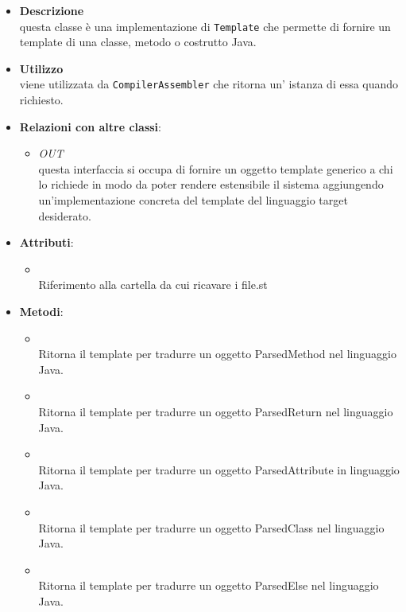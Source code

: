 \begin{itemize}
\item \textbf{Descrizione}\\
questa classe è una implementazione di \texttt{Template} che permette di fornire un template di una classe, metodo o costrutto Java.
\item \textbf{Utilizzo}\\
viene utilizzata da \texttt{CompilerAssembler} che ritorna un' istanza di essa quando richiesto.
\item \textbf{Relazioni con altre classi}:
\begin{itemize}
\item \textit{OUT} \hyperref[\nogloxy{swedesigner::server::template::Template}]{}\\
questa interfaccia si occupa di fornire un oggetto template generico a chi lo richiede in modo da poter rendere estensibile il sistema aggiungendo un'implementazione concreta del template del linguaggio target desiderato.
\end{itemize}
\item \textbf{Attributi}:
\begin{itemize}
\item {}
\\ Riferimento alla cartella da cui ricavare i file.st
\end{itemize}
\item \textbf{Metodi}:
\begin{itemize}
\item {}
\\ Ritorna il template per tradurre un oggetto ParsedMethod nel linguaggio Java.
\item {}
\\ Ritorna il template per tradurre un oggetto ParsedReturn nel linguaggio Java.
\item {}
\\ Ritorna il template per tradurre un oggetto ParsedAttribute in linguaggio Java.
\item {}
\\ Ritorna il template per tradurre un oggetto ParsedClass nel linguaggio Java.
\item {}
\\ Ritorna il template per tradurre un oggetto ParsedElse nel linguaggio Java.

\end{itemize}
\end{itemize}
